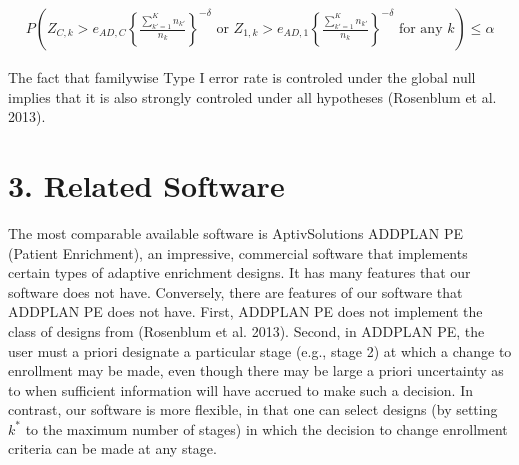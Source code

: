 \documentclass{article}
\begin{document}
\begin{equation*}\begin{split}
P\left(
Z_{C,k}>e_{AD,C} \left\{\frac{\sum_{k'=1}^{K} n_{k'}}{n_k}\right\}^{-δ} \text{  or  } Z_{1,k}> e_{AD,1}\left\{\frac{\sum_{k'=1}^{K} n_{k'}}{n_k}\right\}^{-δ}\text{  for any $k$}
\right) ≤ α 
\end{split}\end{equation*}

The fact that familywise Type I error rate is controled under the global null implies that it is also strongly controled under all hypotheses (Rosenblum et al. 2013)\cite{Rosenblum2013AdaptMISTIE}. 




\section*{3. Related Software}

The most comparable available software is AptivSolutions ADDPLAN PE (Patient Enrichment), an impressive, commercial software that implements certain types of adaptive enrichment designs. It has many features that our software does not have. Conversely, there are features of our software that ADDPLAN PE does not have. First, ADDPLAN PE does not implement the class of designs from (Rosenblum et al. 2013)\cite{Rosenblum2013AdaptMISTIE}. Second, in ADDPLAN PE, the user must a priori designate a particular stage (e.g., stage 2) at which a change to enrollment may be made, even though there may be large a priori uncertainty as to when sufficient information will have accrued to make such a decision. In contrast, our software is more flexible, in that one can select designs (by setting $k^*$ to the maximum number of stages) in which the decision to change enrollment criteria can be made at any stage.  
\end{document}
